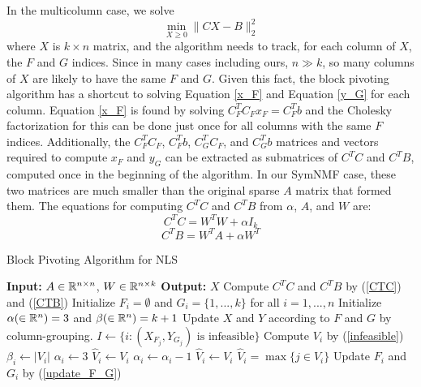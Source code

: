 In the multicolumn case, we solve
\begin{equation} \label{multi_column_nls}
\min_{X \geq 0} \| C X - B \|_2^2
\end{equation}
where $X$ is $k \times n$ matrix, and the algorithm needs to track, for
each column of $X$, the $F$ and $G$ indices. Since in many cases
including ours, $n \gg k$, so many columns of $X$ are likely to have
the same $F$ and $G$. Given this fact, the block pivoting algorithm has
a shortcut to solving Equation \ref{x_F} and Equation \ref{y_G} for
each column. Equation \ref{x_F} is found by solving
$C_F^T C_F x_F = C_F^T b$ and the Cholesky factorization for this can
be done just once for all columns with the same $F$ indices.
Additionally, the $C_F^T C_F$, $C_F^T b$, $C_G^T C_F$, and $C_G^T b$
matrices and vectors required to compute $x_F$ and $y_G$ can be
extracted as submatrices of $C^T C$ and $C^T B$, computed once in the
beginning of the algorithm. In our SymNMF case, these two matrices are
much smaller than the original sparse $A$ matrix that formed them.
The equations for computing $C^T C$ and $C^T B$ from $\alpha$, $A$,
and $W$ are:
\begin{equation} \label{CTC}
C^T C = W^T W + \alpha I_k
\end{equation}
\begin{equation} \label{CTB}
C^T B = W^T A + \alpha W^T
\end{equation}

\begin{algorithm}
\caption{Block Pivoting Algorithm for NLS}
\label{nls_alg}
\begin{algorithmic}
\State \textbf{Input:} $A \in \mathbb{R}^{n \times n}$, $W \in \mathbb{R}^{n \times k}$
\State \textbf{Output:} $X$
\State Compute $C^T C$ and $C^T B$ by (\ref{CTC}) and (\ref{CTB})
\State Initialize $F_i = \emptyset$ and $G_i = \{1, ..., k\}$
       for all $i = 1, ..., n$
\State Initialize $\alpha (\in \mathbb{R}^n) = 3$ and $\beta (\in \mathbb{R}^n) = k + 1$
\Repeat
  \State Update $X$ and $Y$ according to $F$ and $G$ by column-grouping.
  \State $I \gets \{i : (X_{F_j}, Y_{G_j}) \text{ is infeasible}\}$
    \State Compute $V_i$ by (\ref{infeasible})
      \State $\beta_i \gets |V_i|$
      \State $\alpha_i \gets 3$
      \State $\hat{V}_i \gets V_i$
      \State $\alpha_i \gets \alpha_i - 1$
      \State $\hat{V}_i \gets V_i$
      \State $\hat{V}_i = \max \{j \in V_i\}$
    \EndIf
    \State Update $F_i$ and $G_i$ by (\ref{update_F_G})
  \EndFor
{}
\end{algorithmic}
\end{algorithm}

